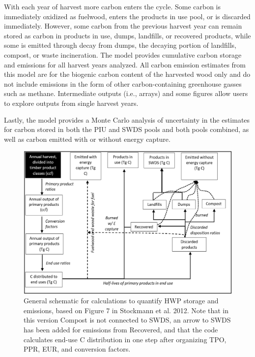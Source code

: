 \documentclass[
  openany]{book}
\begin{document}
With each year of harvest more carbon enters the cycle. Some carbon is immediately oxidized as fuelwood, enters the products in use pool, or is discarded immediately. However, some carbon from the previous harvest year can remain stored as carbon in products in use, dumps, landfills, or recovered products, while some is emitted through decay from dumps, the decaying portion of landfills, compost, or waste incineration. The model provides cumulative carbon storage and emissions for all harvest years analyzed. All carbon emission estimates from this model are for the biogenic carbon content of the harvested wood only and do not include emissions in the form of other carbon-containing greenhouse gasses such as methane. Intermediate outputs (i.e., arrays) and some figures allow users to explore outputs from single harvest years.

Lastly, the model provides a Monte Carlo analysis of uncertainty in the estimates for carbon stored in both the PIU and SWDS pools and both pools combined, as well as carbon emitted with or without energy capture.

\begin{figure}
\includegraphics[width=1\linewidth]{images/OverviewModelSchematic} \caption{General schematic for calculations to quantify HWP storage and emissions, based on Figure 7 in Stockmann et al. 2012.  Note that in this version Compost is not connected to SWDS, an arrow to SWDS has been added for emissions from Recovered, and that the code calculates end-use C distribution in one step after organizing TPO, PPR, EUR, and conversion factors.}\label{fig:overview-fig}
\end{figure}
\end{document}
